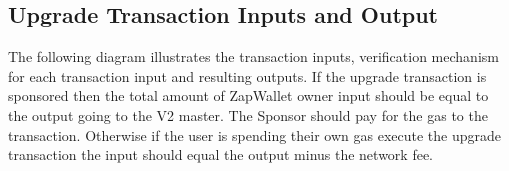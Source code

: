 \subsection{Upgrade Transaction Inputs and Output}
The following diagram illustrates the transaction inputs, verification mechanism for each transaction input and resulting outputs. If
the upgrade transaction is sponsored then the total amount of ZapWallet owner  input should be equal to the 
output going to the V2 master. The Sponsor should pay for the gas to the transaction. Otherwise if the user is spending their own gas execute
the upgrade transaction the  input should equal the  output minus the network fee.


\begin{figure}[H]
\end{figure}
